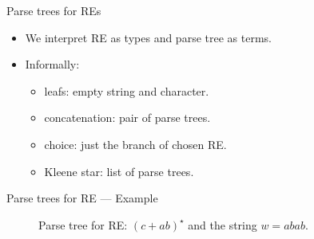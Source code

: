 \documentclass{beamer}
\newcommand{\C}[1]{\red{\mathsf{#1}}}
\newcommand{\V}[1]{\purple{\mathit{#1}}}
\begin{document}
   \begin{frame}{Parse trees for REs}
     \begin{itemize}
       \item We interpret RE as types and parse tree as terms.
       \item Informally:
       \begin{itemize}
         \item leafs: empty string and character.
         \item concatenation: pair of parse trees.
         \item choice: just the branch of chosen RE.
         \item Kleene star: list of parse trees.
       \end{itemize}
     \end{itemize}
   \end{frame}

   \begin{frame}{Parse trees for RE --- Example}
     \begin{figure}
       \centering
       \caption{Parse tree for RE: $(c + ab)^\star$ and the string $w = abab$.}
     \end{figure}
   \end{frame}
\end{document}
